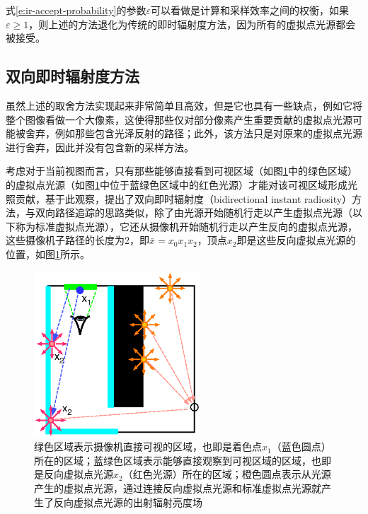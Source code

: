 式\ref{e:ir-accept-probability}的参数$\varepsilon$可以看做是计算和采样效率之间的权衡，如果$\varepsilon\geq 1$，则上述的方法退化为传统的即时辐射度方法，因为所有的虚拟点光源都会被接受。




\subsection{双向即时辐射度方法}\label{sec:ir-bir}
虽然上述的取舍方法实现起来非常简单且高效，但是它也具有一些缺点，例如它将整个图像看做一个大像素，这使得那些仅对部分像素产生重要贡献的虚拟点光源可能被舍弃，例如那些包含光泽反射的路径；此外，该方法只是对原来的虚拟点光源进行舍弃，因此并没有包含新的采样方法。

考虑对于当前视图而言，只有那些能够直接看到可视区域（如图\ref{f:ir-bir}中的绿色区域）的虚拟点光源（如图\ref{f:ir-bir}中位于蓝绿色区域中的红色光源）才能对该可视区域形成光照贡献，基于此观察，\cite{a:BidirectionalInstantRadiosity}提出了双向即时辐射度（bidirectional instant radiosity）方法，与双向路径追踪的思路类似，除了由光源开始随机行走以产生虚拟点光源（以下称为标准虚拟点光源），它还从摄像机开始随机行走以产生反向的虚拟点光源，这些摄像机子路径的长度为2，即$\bar{x}=x_0x_1x_2$，顶点$x_2$即是这些反向虚拟点光源的位置，如图\ref{f:ir-bir}所示。

\begin{figure}
	\sidecaption
	\includegraphics[width=0.55\textwidth]{figures/ir/bir}
	\caption{绿色区域表示摄像机直接可视的区域，也即是着色点$x_1$（蓝色圆点）所在的区域；蓝绿色区域表示能够直接观察到可视区域的区域，也即是反向虚拟点光源$x_2$（红色光源）所在的区域；橙色圆点表示从光源产生的虚拟点光源，通过连接反向虚拟点光源和标准虚拟点光源就产生了反向虚拟点光源的出射辐射亮度场}
	\label{f:ir-bir}
\end{figure}

